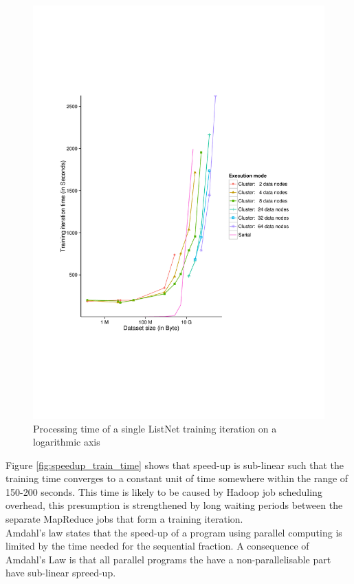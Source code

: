\begin{figure}
\centering
\includegraphics[trim=0cm 5cm 0cm 5cm, scale=0.7]{gfx/time_single_logx.pdf}
\caption{Processing time of a single ListNet training iteration on a logarithmic axis}
\label{fig:listnet_train_time_log}
\end{figure}

Figure \ref{fig:speedup_train_time} shows that speed-up is sub-linear such that the training time converges to a constant unit of time somewhere within the range of 150-200 seconds. This time is likely to be caused by Hadoop job scheduling overhead, this presumption is strengthened by long waiting periods between the separate MapReduce jobs that form a training iteration.\\

Amdahl's law states that the speed-up of a program using parallel computing is limited by the time needed for the sequential fraction. A consequence of Amdahl's Law is that all parallel programs the have a non-parallelisable part have sub-linear spreed-up. %

